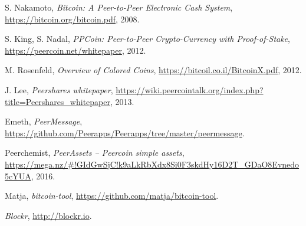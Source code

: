 \documentclass[a4paper,10pt]{article}
\begin{document}
\begin{thebibliography}{9}

  S. Nakamoto,
  \emph{Bitcoin: A Peer-to-Peer Electronic Cash System},
  \url{https://bitcoin.org/bitcoin.pdf},
  2008.

  S. King, S. Nadal,
  \emph{PPCoin: Peer-to-Peer Crypto-Currency with Proof-of-Stake},
  \url{https://peercoin.net/whitepaper},
  2012.

  M. Rosenfeld,
  \emph{Overview of Colored Coins},
  \url{https://bitcoil.co.il/BitcoinX.pdf},
  2012.

  J. Lee,
  \emph{Peershares whitepaper},
  \url{https://wiki.peercointalk.org/index.php?title=Peershares_whitepaper},
  2013.

  Emeth,
  \emph{PeerMessage},
  \url{https://github.com/Peerapps/Peerapps/tree/master/peermessage}.

  Peerchemist,
  \emph{PeerAssets – Peercoin simple assets},
  \url{https://mega.nz/#!GIdGwSjC!k9aLkRbXdx8Si0F3skdHy16D2T_GDaO8Evnedo5cYUA},
  2016.

  Matja,
  \emph{bitcoin-tool},
  \url{https://github.com/matja/bitcoin-tool}.

  \emph{Blockr},
  \url{http://blockr.io}.

\end{thebibliography}
\end{document}
